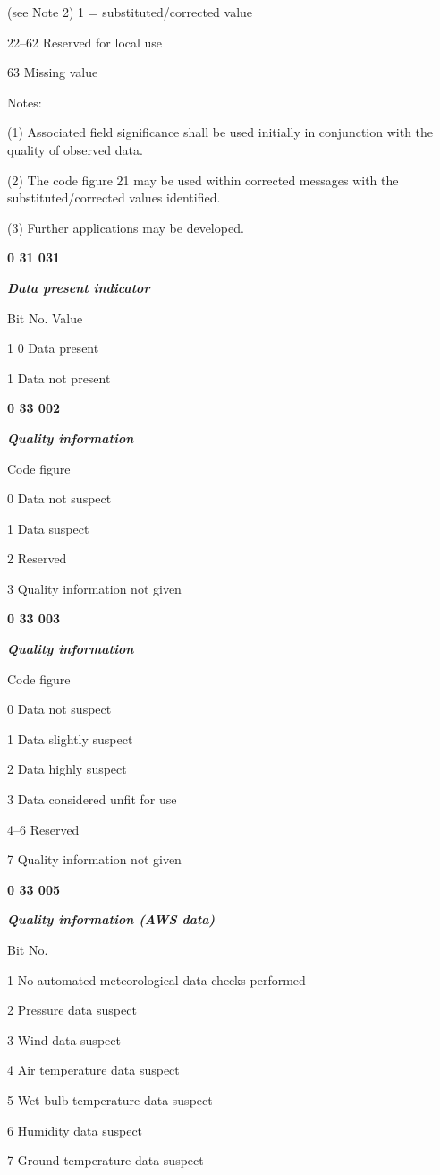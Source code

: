 (see Note 2) 1 = substituted/corrected value

22--62 Reserved for local use

63 Missing value

Notes:

(1) Associated field significance shall be used initially in conjunction with the quality of observed data.

(2) The code figure 21 may be used within corrected messages with the substituted/corrected values identified.

(3) Further applications may be developed.

\textbf{0 31 031}

\emph{\textbf{Data present indicator}}

Bit No. Value

1 0 Data present

1 Data not present

\textbf{0 33 002}

\emph{\textbf{Quality information}}

Code figure

0 Data not suspect

1 Data suspect

2 Reserved

3 Quality information not given

\textbf{0 33 003}

\emph{\textbf{Quality information}}

Code figure

0 Data not suspect

1 Data slightly suspect

2 Data highly suspect

3 Data considered unfit for use

4--6 Reserved

7 Quality information not given

\textbf{0 33 005}

\emph{\textbf{Quality information (AWS data)}}

Bit No.

1 No automated meteorological data checks performed

2 Pressure data suspect

3 Wind data suspect

4 Air temperature data suspect

5 Wet-bulb temperature data suspect

6 Humidity data suspect

7 Ground temperature data suspect

